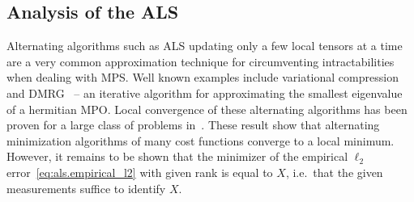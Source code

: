 \subsection{Analysis of the ALS}%
\label{sub:als.ana}

Alternating algorithms such as ALS updating only a few local tensors at a time are a very common approximation technique for circumventing intractabilities when dealing with MPS.
Well known examples include variational compression and DMRG~\cite{Schollwoeck} --  an iterative algorithm for approximating the smallest eigenvalue of a hermitian MPO.
Local convergence of these alternating algorithms has been proven for a large class of problems in~\cite{Rohwedder}.
These result show that alternating minimization algorithms of many cost functions converge to a local minimum.
However, it remains to be shown that the minimizer of the empirical $\ell_2$ error~\eqref{eq:als.empirical_l2} with given rank is equal to $X$, i.e.\ that the given measurements suffice to identify $X$.

